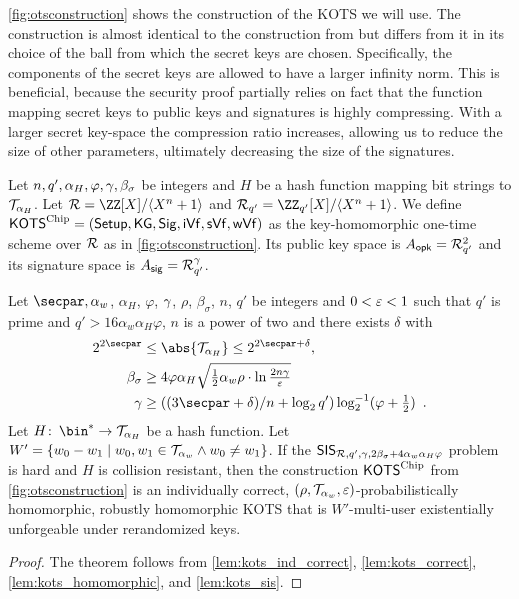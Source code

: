 \autoref{fig:otsconstruction} shows the construction of the KOTS we will use.
The construction is almost identical to the construction from \cite{CCS:FleSimZha22} but differs from it in its choice of the ball from which the secret keys are chosen.
Specifically, the components of the secret keys are allowed to have a larger infinity norm.
This is beneficial, because the security proof partially relies on fact that the function mapping secret keys to public keys and signatures is highly compressing.
With a larger secret key-space the compression ratio increases, allowing us to reduce the size of other parameters, ultimately decreasing the size of the signatures.

\begin{definition}\label{def:our_ots}
Let $n, q', \alpha_H, \varphi, \gamma, \beta_\sigma$ be integers and $H$ be a hash function mapping bit strings to $\mathcal{T}_{\alpha_H}$.
Let $\ring = \defring$ and $\ring_{q'} = \defringqq$.
% 
We define $\mathsf{KOTS}^{\textup{Chip}} = (\mathsf{Setup}, \mathsf{KG}, \mathsf{Sig},\allowbreak \mathsf{iVf}, \mathsf{sVf}, \mathsf{wVf})$ as the key-homomorphic one-time scheme over $\mathcal{R}$ as in \autoref{fig:otsconstruction}.
Its public key space is $A_{\mathsf{opk}} = \mathcal{R}_{q'}^{2}$ and its signature space is $A_{\mathsf{sig}} = \mathcal{R}_{q'}^\gamma$.
\end{definition}


\begin{theorem}\label{theo:kots}
Let $\secpar, \alpha_w$, $\alpha_H$, $\varphi$, $\gamma$, $\rho$, $\beta_\sigma$, $n$, $q'$ be integers and $0 < \varepsilon < 1$ such that $q'$ is prime and $q' > 16\alpha_w\alpha_H\varphi$, $n$ is a power of two and there exists $\delta$ with
\begin{align*}
2^{2\secpar} & \leq \abs{\tern_{\alpha_H}} \leq 2^{2\secpar+\delta},\\
\beta_\sigma & \geq 4\varphi\alpha_H\sqrt{\tfrac{1}{2}\alpha_w\rho \cdot \ln\tfrac{2n\otspkkeylen}{\errorbound} }\\
\otspkkeylen & \geq((3\secpar+\delta)/n+\log_2q')\log^{-1}_2(\varphi+\tfrac{1}{2})\enspace.
\end{align*}
Let $H\colon\, \bin^* \to \tern_{\alpha_H}$ be a hash function.
Let $W' = \{w_0-w_1\mid w_0,w_1\in\mathcal{T}_{\alpha_w} \land w_0\neq w_1\}$.
If the $\mathsf{SIS}_{\mathcal{R},q',\gamma,2\beta_\sigma+4\alpha_w\alpha_H\varphi}$ problem is hard and $H$ is collision resistant,
then the construction $\mathsf{KOTS}^{\textup{Chip}}$ from \autoref{fig:otsconstruction} is an individually correct, $(\rho,\mathcal{T}_{\alpha_w},\varepsilon)$-probabilistically homomorphic, robustly homomorphic KOTS that is $W'$-multi-user existentially unforgeable under rerandomized keys.
\end{theorem}
\begin{proof}
The theorem follows from \autoref{lem:kots_ind_correct}, \ref{lem:kots_correct}, \ref{lem:kots_homomorphic}, and \ref{lem:kots_sis}.
\end{proof}

